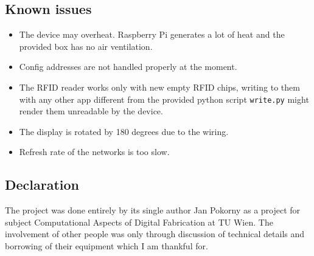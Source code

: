\documentclass{article}
\begin{document}
\subsection{Known issues}
\begin{itemize}
    \item The device may overheat. Raspberry Pi generates a lot of heat and the provided box has no air ventilation.
    \item Config addresses are not handled properly at the moment.
    \item The RFID reader works only with new empty RFID chips, writing to them with any other app different from the provided python script \texttt{write.py} might render them unreadable by the device.
    \item The display is rotated by 180 degrees due to the wiring. 
    \item Refresh rate of the networks is too slow.
\end{itemize}

\subsection{Declaration}
    The project was done entirely by its single author Jan Pokorny as a project for subject Computational Aspects of Digital Fabrication at TU Wien. 
    The involvement of other people was only through discussion of technical details and borrowing of their equipment which I am thankful for.
\end{document}
